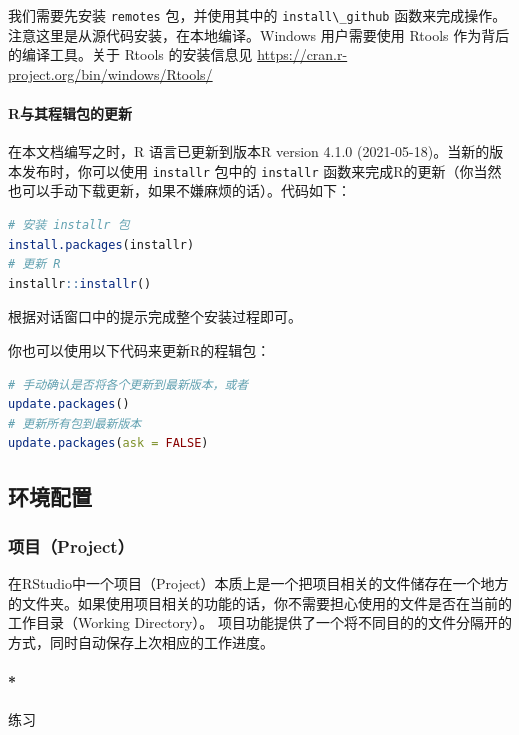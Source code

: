 \documentclass[]{ctexbook}
\let\oldparagraph\paragraph
\renewcommand{\paragraph}[1]{\oldparagraph{#1}\mbox{}}
\newcommand{\passthrough}[1]{#1}
\begin{document}
我们需要先安装 \passthrough{\lstinline!remotes!} 包，并使用其中的 \passthrough{\lstinline!install\_github!} 函数来完成操作。注意这里是从源代码安装，在本地编译。Windows 用户需要使用 Rtools 作为背后的编译工具。关于 Rtools 的安装信息见 \url{https://cran.r-project.org/bin/windows/Rtools/}

\hypertarget{rux4e0eux5176ux7a0bux8f91ux5305ux7684ux66f4ux65b0}{%
\paragraph{R与其程辑包的更新}\label{rux4e0eux5176ux7a0bux8f91ux5305ux7684ux66f4ux65b0}}

在本文档编写之时，R 语言已更新到版本R version 4.1.0 (2021-05-18)。当新的版本发布时，你可以使用 \passthrough{\lstinline!installr!} 包中的 \passthrough{\lstinline!installr!} 函数来完成R的更新（你当然也可以手动下载更新，如果不嫌麻烦的话）。代码如下：

\begin{lstlisting}[language=R]
# 安装 installr 包
install.packages(installr)
# 更新 R
installr::installr()
\end{lstlisting}

根据对话窗口中的提示完成整个安装过程即可。

你也可以使用以下代码来更新R的程辑包：

\begin{lstlisting}[language=R]
# 手动确认是否将各个更新到最新版本，或者
update.packages()
# 更新所有包到最新版本
update.packages(ask = FALSE)
\end{lstlisting}

\hypertarget{ux73afux5883ux914dux7f6e}{%
\subsection{环境配置}\label{ux73afux5883ux914dux7f6e}}

\hypertarget{ux9879ux76eeproject}{%
\subsubsection{项目（Project）}\label{ux9879ux76eeproject}}

在RStudio中一个项目（Project）本质上是一个把项目相关的文件储存在一个地方的文件夹。如果使用项目相关的功能的话，你不需要担心使用的文件是否在当前的工作目录（Working Directory）。 项目功能提供了一个将不同目的的文件分隔开的方式，同时自动保存上次相应的工作进度。

\hypertarget{ux7ec3ux4e60}{%
\paragraph*{练习}\label{ux7ec3ux4e60}}
\end{document}
